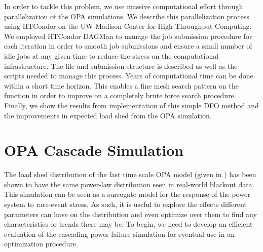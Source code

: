 In order to tackle this problem, we use massive computational effort through parallelization of the OPA simulations.  We describe this parallelization process using HTCondor on the UW-Madison Center for High Throughput Computing.  We employed HTCondor DAGMan to manage the job submission procedure for each iteration in order to smooth job submissions and ensure a small number of idle jobs at any given time to reduce the stress on the computational infrastructure.  The file and submission structure is described as well as the scripts needed to manage this process.  Years of computational time can be done within a short time horizon.  This enables a fine mesh search pattern on the function in order to improve on a completely brute force search procedure.  Finally, we show the results from implementation of this simple DFO method and the improvements in expected load shed from the OPA simulation.


\section{OPA Cascade Simulation}

The load shed distribution of the fast time scale OPA model (given in ) has been shown to have the same power-law distribution seen in real-world blackout data.  This simulation can be seen as a surrogate model for the response of the power system to rare-event stress.  As such, it is useful to explore the effects different parameters can have on the distribution and even optimize over them to find any characteristics or trends there may be. To begin, we need to develop an efficient evaluation of the cascading power failure simulation for eventual use in an optimization procedure. 

